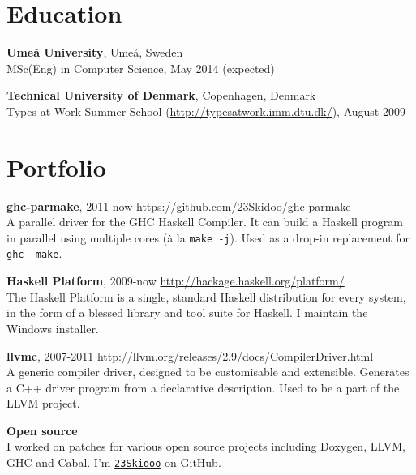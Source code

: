 \documentclass[margin,line]{res}
\begin{document}
\begin{resume}

\section{\sc Education}
{\bf Umeå University}, Umeå, Sweden\\
MSc(Eng) in Computer Science, May 2014 (expected)

{\bf Technical University of Denmark}, Copenhagen, Denmark\\
Types at Work Summer School (\url{http://typesatwork.imm.dtu.dk/}), August 2009

\section{\sc Portfolio}

{\bf ghc-parmake}, 2011-now \hfill \url{https://github.com/23Skidoo/ghc-parmake}\\
A parallel driver for the GHC Haskell Compiler. It can build a Haskell
program in parallel using multiple cores (à la \texttt{make -j}). Used as a
drop-in replacement for \texttt{ghc --make}.

{\bf Haskell Platform}, 2009-now \hfill \url{http://hackage.haskell.org/platform/}\\
The Haskell Platform is a single, standard Haskell distribution for every
system, in the form of a blessed library and tool suite for Haskell. I maintain
the Windows installer.

{\bf llvmc}, 2007-2011 \hfill \url{http://llvm.org/releases/2.9/docs/CompilerDriver.html}\\
A generic compiler driver, designed to be customisable and extensible. Generates
a C++ driver program from a declarative description. Used to be a part of the
LLVM project.


{\bf Open source}\\ I worked on patches for various open source projects
including Doxygen, LLVM, GHC and Cabal. I'm
\href{https://github.com/23Skidoo/}{\texttt{23Skidoo}} on GitHub.


\end{resume}
\end{document}
